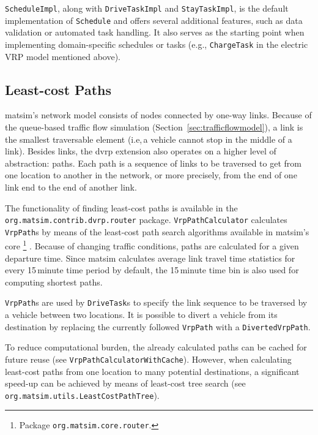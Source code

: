 \lstinline$ScheduleImpl$, along with \lstinline$DriveTaskImpl$ and \lstinline$StayTaskImpl$, is the default implementation of \lstinline$Schedule$ and offers several additional features, such as data validation or automated task handling. It also serves as the starting point when implementing domain-specific schedules or tasks (e.g., \lstinline$ChargeTask$ in the electric VRP model mentioned above).

\subsection{Least-cost Paths}
\label{sec:VRP-router}

\gls{matsim}'s network model consists of nodes connected by one-way links. Because of the queue-based traffic flow simulation (Section~\ref{sec:trafficflowmodel}), a link is the smallest traversable element (i.e,\,a vehicle cannot stop in the middle of a link). Besides links, the \gls{dvrp} extension also operates on a higher level of abstraction: paths. Each path is a sequence of links to be traversed to get from one location to another in the network, or more precisely, from the end of one link end to the end of another link. 

The functionality of finding least-cost paths is available in the \lstinline$org.matsim.contrib.dvrp.router$ package. \lstinline$VrpPathCalculator$ calculates \lstinline$VrpPath$s by means of the least-cost path search algorithms available in \gls{matsim}'s core%
\footnote{
Package \lstinline$org.matsim.core.router$.
}
\citep{JacobMaratheEtAl1999computationalstudyof,LefebvreBalmer2007Fastshortestpath}. Because of changing traffic conditions, paths are calculated for a given departure time. Since \gls{matsim} calculates average link travel time statistics for every 15\,minute time period by default, the 15\,minute time bin is also used for computing shortest paths.

\lstinline$VrpPath$s are used by \lstinline$DriveTask$s to specify the link sequence to be traversed by a vehicle between two locations. It is possible to divert a vehicle from its destination by replacing the currently followed \lstinline$VrpPath$ with a \lstinline$DivertedVrpPath$.

To reduce computational burden, the already calculated paths can be cached for future reuse (see \lstinline$VrpPathCalculatorWithCache$). However, when calculating least-cost paths from one location to many potential destinations, a significant speed-up can be achieved by means of least-cost tree search (see \lstinline$org.matsim.utils.LeastCostPathTree$).


